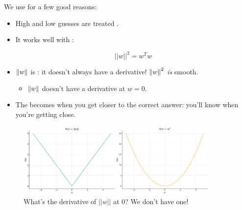         \begin{concept}
             We use  for a few good reasons:
        
        \begin{itemize}
            \item High and low guesses are treated .
            
            \item It works well with :

                \begin{equation*}
                    ||w||^2 = w^Tw
                \end{equation*}
            
            \item $\left\lVert w\right\rVert$ is : it doesn't always have a derivative! $\left\lVert w\right\rVert^2$ \textit{is} smooth.
                \begin{itemize}
                    \item $\left\lVert w\right\rVert$ doesn't have a derivative at $w=0$.
                \end{itemize}

            \item The  becomes  when you get closer to the correct answer: you'll know when you're getting close.
        \end{itemize}
        \end{concept}


        \begin{figure}[H]
            \centering
            \includegraphics[width=100mm,scale=0.5]{images/regression_images/abs_w_vs_w_squared.png}
        
            \caption*{What's the derivative of $||w||$ at 0? We don't have one!}
        \end{figure}

